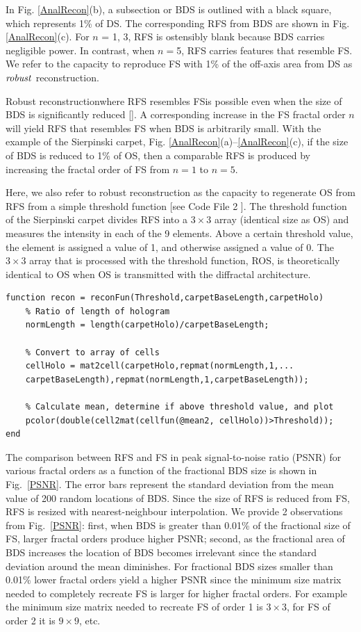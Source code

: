 In Fig. \ref{AnalRecon}(b), a subsection or BDS is outlined with a black square, which represents 1\% of DS. The corresponding RFS from BDS are shown in Fig. \ref{AnalRecon}(c). For $n$ = 1, 3, RFS is ostensibly blank because BDS carries negligible power.  In contrast, when $n=$5, RFS carries features that resemble FS.  We refer to the capacity to reproduce FS with 1\% of the off-axis area from DS as ${\it robust}$ reconstruction.  

Robust reconstruction\textemdash where RFS resembles FS\textemdash is possible even when the size of BDS is significantly reduced [\cite{Verma}].  A corresponding increase in the FS fractal order $n$ will yield RFS that resembles FS when BDS is arbitrarily small. With the example of the Sierpinski carpet, Fig. \ref{AnalRecon}(a)--\ref{AnalRecon}(c), if the size of BDS is reduced to 1\% of OS, then a comparable RFS is produced by increasing the fractal order of FS from $n=1$ to $n = 5$. 

Here, we also refer to robust reconstruction as the capacity to regenerate OS from RFS from a simple threshold function [see Code File 2 \cite{Code2}]. The threshold function of the Sierpinski carpet divides RFS into a $3\times 3$ array (identical size as OS) and measures the intensity in each of the 9 elements. Above a certain threshold value, the element is assigned a value of 1, and otherwise assigned a value of 0. The $3\times 3$ array that is processed with the threshold function, ROS, is theoretically identical to OS when OS is transmitted with the diffractal architecture. 

\begin{lstlisting}
function recon = reconFun(Threshold,carpetBaseLength,carpetHolo)
	% Ratio of length of hologram
	normLength = length(carpetHolo)/carpetBaseLength; 
	
	% Convert to array of cells
	cellHolo = mat2cell(carpetHolo,repmat(normLength,1,...
	carpetBaseLength),repmat(normLength,1,carpetBaseLength));
	
	% Calculate mean, determine if above threshold value, and plot
	pcolor(double(cell2mat(cellfun(@mean2, cellHolo))>Threshold));
end
\end{lstlisting}

The comparison between RFS and FS in peak signal-to-noise ratio (PSNR) for various fractal orders as a function of the fractional BDS size is shown in Fig.~\ref{PSNR}. The error bars represent the standard deviation from the mean value of 200 random locations of BDS. Since the size of RFS is reduced from FS, RFS is resized with nearest-neighbour interpolation. We provide 2 observations from Fig.~\ref{PSNR}: first, when BDS is greater than 0.01\% of the fractional size of FS, larger fractal orders produce higher PSNR; second, as the fractional area of BDS increases the location of BDS becomes irrelevant since the standard deviation around the mean diminishes. For fractional BDS sizes smaller than 0.01\% lower fractal orders yield a higher PSNR since the minimum size matrix needed to completely recreate FS is larger for higher fractal orders. For example the minimum size matrix needed to recreate FS of order 1 is $3\times 3$, for FS of order 2 it is $9\times 9$, etc. 

